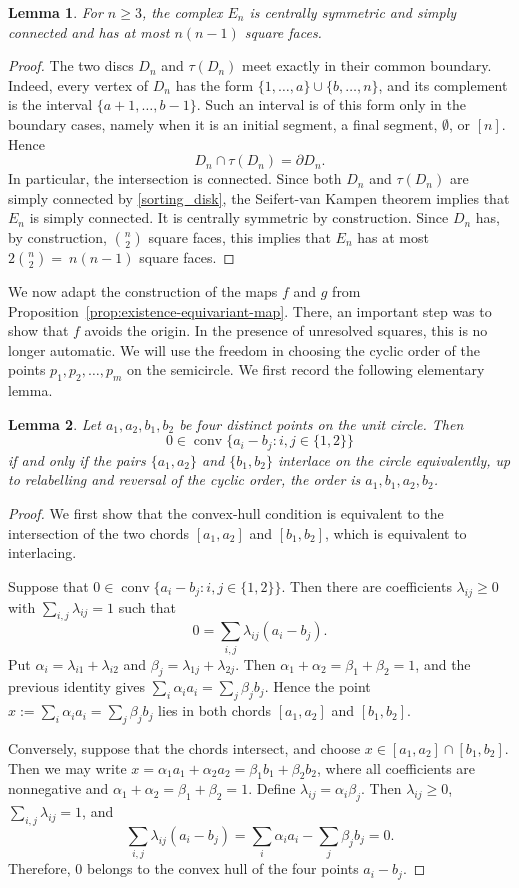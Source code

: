 \documentclass[12pt,UKenglish]{amsart}
\theoremstyle{plain}
\newtheorem{lemma}[lemma]{Lemma}
\theoremstyle{definition}
\theoremstyle{remark}
\begin{document}
\begin{lemma}\label{lem:En}
For $n \ge3$, the complex \(E_n\) is centrally symmetric and simply connected and has at most $n(n-1)$ square faces.
\end{lemma}
\begin{proof}
The two discs \(D_n\) and \(\tau(D_n)\) meet exactly in their common boundary. Indeed, every vertex of
$D_n$ has the form $\{1,\ldots,a\}\cup\{b,\ldots,n\}$, and its complement is
the interval $\{a+1,\ldots,b-1\}$. Such an interval is of this form only
in the boundary cases, namely when it is an initial segment, a final segment,
$\emptyset$, or $[n]$. Hence
\[
D_n\cap \tau(D_n)=\partial D_n .
\]
In particular, the intersection is connected. Since both $D_n$ and $\tau(D_n)$
are simply connected by \cref{sorting_disk}, the Seifert-van Kampen theorem
implies that $E_n$ is simply connected. It is centrally symmetric by
construction. Since $D_n$ has, by construction, $\binom n2$ square faces, this implies that $E_n$ has at most $2\binom n2=~n(n-1)$ square faces. 
\end{proof}
We now adapt the construction of the maps $f$ and $g$ from Proposition~\ref{prop:existence-equivariant-map}. There, an important step was to show that $f$ avoids the origin. In the presence of unresolved squares, this is no longer automatic. We will use the freedom in choosing the cyclic order of the points $p_1,p_2,\dots,p_m$ on the semicircle. We first record the following elementary lemma.
\begin{lemma}\label{lemma:4 point ordering}
Let $a_1,a_2,b_1,b_2$ be four distinct points on the unit circle. Then
\[
0\in \operatorname{conv}\{a_i-b_j:i,j\in\{1,2\}\}
\]
if and only if the pairs $\{a_1,a_2\}$ and $\{b_1,b_2\}$ interlace on the circle equivalently, up to relabelling and reversal of the cyclic order, the order is $a_1,b_1,a_2,b_2$.
\end{lemma}
\begin{proof}
We first show that the convex-hull condition is equivalent to the intersection of the two chords $[a_1,a_2]$ and $[b_1,b_2]$, which is equivalent to interlacing.

Suppose that $0\in \operatorname{conv}\{a_i-b_j:i,j\in\{1,2\}\}$. Then there are coefficients $\lambda_{ij}\ge 0$ with $\sum_{i,j}\lambda_{ij}=1$ such that
\[
0=\sum_{i,j}\lambda_{ij}(a_i-b_j).
\]
Put $\alpha_i=\lambda_{i1}+\lambda_{i2}$ and $\beta_j=\lambda_{1j}+\lambda_{2j}$. Then $\alpha_1+\alpha_2=\beta_1+\beta_2=1$, and the previous identity gives $\sum_i\alpha_i a_i=\sum_j\beta_j b_j$. Hence the point $x:=\sum_i\alpha_i a_i=\sum_j\beta_j b_j$ lies in both chords $[a_1,a_2]$ and $[b_1,b_2]$. 

Conversely, suppose that the chords intersect, and choose $x\in [a_1,a_2]\cap [b_1,b_2]$. Then we may write $x=\alpha_1a_1+\alpha_2a_2=\beta_1b_1+\beta_2b_2$, where all coefficients are nonnegative and $\alpha_1+\alpha_2=\beta_1+\beta_2=1$. Define $\lambda_{ij}=\alpha_i\beta_j$. Then $\lambda_{ij}\ge 0$, $\sum_{i,j}\lambda_{ij}=1$, and
\[
\sum_{i,j}\lambda_{ij}(a_i-b_j)=\sum_i\alpha_i a_i-\sum_j\beta_j b_j=0.
\]
Therefore, $0$ belongs to the convex hull of the four points $a_i-b_j$.
\end{proof}
\end{document}
